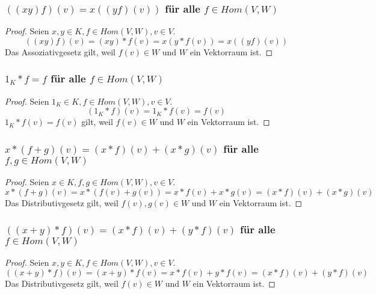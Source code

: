 \documentclass[a4paper,10pt]{article}
\begin{document}
\subsubsection*{$((xy)f)(v) = x((yf)(v))$ für alle $f \in Hom(V, W)$}

\begin{proof}
 Seien $x, y \in K, f \in Hom(V, W), v \in V$.
 \begin{equation}
  ((xy)f)(v) = (xy) * f(v) = x(y * f(v)) = x((yf)(v))
 \end{equation}
 Das Assoziativgesetz gilt, weil $f(v) \in W$ und $W$ ein Vektorraum ist.
\end{proof}

\subsubsection*{$1_K * f = f$ für alle $f \in Hom(V, W)$}

\begin{proof}
 Seien $1_K \in K, f \in Hom(V, W), v \in V$.
 \begin{equation}
  (1_K * f)(v) = 1_K * f(v) = f(v)
 \end{equation}
 $1_K * f(v) = f(v)$ gilt, weil $f(v) \in W$ und $W$ ein Vektorraum ist.
\end{proof}

\subsubsection*{$x * (f + g)(v) = (x * f)(v) + (x * g)(v)$ für alle $f, g \in Hom(V, W)$}

\begin{proof}
 Seien $x \in K, f, g \in Hom(V, W), v \in V$.
 \begin{equation}
  x * (f + g)(v) = x * (f(v) + g(v)) = x * f(v) + x * g(v) = (x * f)(v) + (x * g)(v)
 \end{equation}
 Das Distributivgesetz gilt, weil $f(v), g(v) \in W$ und $W$ ein Vektorraum ist.
\end{proof}

\subsubsection*{$((x + y) * f)(v) = (x * f)(v) + (y * f)(v)$ für alle $f \in Hom(V, W)$}

\begin{proof}
 Seien $x, y \in K, f \in Hom(V, W), v \in V$.
 \begin{equation}
  ((x + y) * f)(v) = (x + y) * f(v) = x * f(v) + y * f(v) = (x * f)(v) + (y * f)(v)
 \end{equation}
 Das Distributivgesetz gilt, weil $f(v) \in W$ und $W$ ein Vektorraum ist.
\end{proof}
\end{document}
